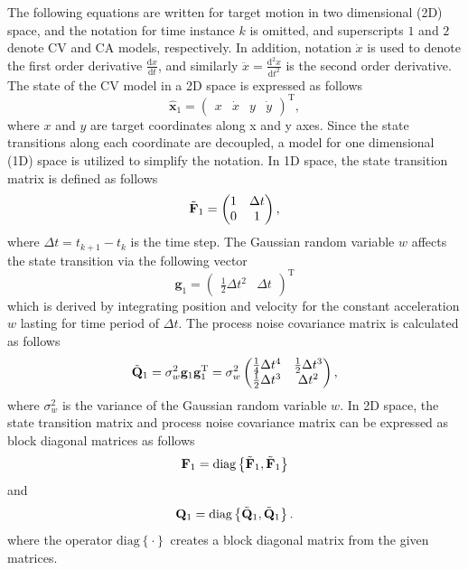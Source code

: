 \documentclass[english, 12pt, a4paper, elec, utf8, a-1b, online]{aaltothesis}
\numberwithin{equation}{section}
\renewcommand{\vec}[1]{\mathbf{#1}}
\newcommand{\transpose}[1]{#1^\text{T}}
\newcommand{\dt}{\Delta t}
\newcommand{\diag}[1]{\text{diag}\left\{ #1 \right\}}
\begin{document}
The following equations are written for target motion in two dimensional (2D) space, and
the notation for time instance $k$ is omitted, and superscripts $1$ and $2$ denote CV and CA models, respectively. 
In addition, notation $\dot{x}$ is used to denote the first order derivative $\frac{\text{d} x}{\text{d} t}$, and similarly $\ddot{x}=\frac{\text{d}^2 x}{\text{d} t^2}$ is the second order derivative.
The state of the CV model in a 2D space is expressed as follows
\begin{equation}\label{eq:x_mode1}
    \hat{\mathbf{x}}_1 =
        \transpose{
        \begin{pmatrix}
            x & \dot{x} & y & \dot{y}
    \end{pmatrix}},
\end{equation}
where $x$ and $y$ are target coordinates along x and y axes. 
Since the state transitions along each coordinate are decoupled, a model for one dimensional (1D) space is utilized to simplify the notation.
In 1D space, the state transition matrix is defined as follows
\begin{equation}\label{eq:f_mode1}
    \Tilde{\vec{F}}_1 =
    \begin{pmatrix}
        1 & \dt \\
        0 & 1  \\
    \end{pmatrix},
\end{equation}
where $\dt=t_{k+1} - t_k$ is the time step.
The Gaussian random variable $w$ affects the state transition via the following vector
\begin{equation}\label{eq:g_noise_mode1}
\vec{g}_1 =\transpose{\begin{pmatrix}
        \frac{1}{2} \dt^2 & \dt
    \end{pmatrix}}
\end{equation}
which is derived by integrating position and velocity for the constant acceleration $w$ lasting for time period of $\dt$.
The process noise covariance matrix is calculated as follows  
\begin{equation}
    \Tilde{\vec{Q}}_1 = \sigma_w^2 \vec{g}_1 \transpose{\vec{g}_1}
    = \sigma_w^2
    \begin{pmatrix}
        \frac{1}{4} \dt^4 & \frac{1}{2} \dt^3 \\ 
        \frac{1}{2} \dt^3 & \dt^2 \\ 
    \end{pmatrix},
\end{equation}
where $\sigma_w^2$ is the variance of the Gaussian random variable $w$.
In 2D space, the state transition matrix and process noise covariance matrix can be expressed as block diagonal matrices as follows 
\begin{equation}\label{eq:F_mode1}
\vec{F}_1 = \diag{\Tilde{\vec{F}}_1, \Tilde{\vec{F}}_1}
\end{equation}
and
\begin{equation}
    \vec{Q}_1 = \diag{\Tilde{\vec{Q}}_1, \Tilde{\vec{Q}}_1}.
\end{equation}
where the operator $\diag{\cdot}$ creates a block diagonal matrix from the given matrices.
\end{document}
